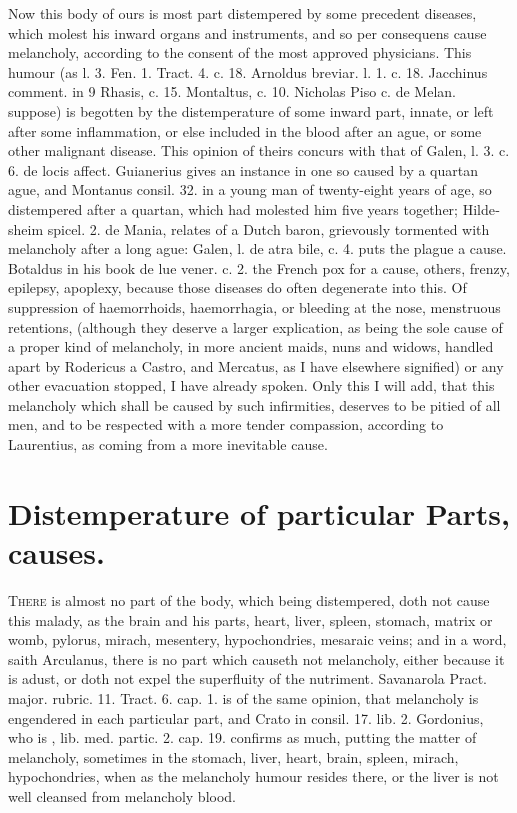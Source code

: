 {{Now this body of ours is most part distempered by some precedent
diseases, which molest his inward organs and instruments, and so per
consequens cause melancholy, according to the consent of the most
approved physicians. This humour (as \Avicenna{} l. 3. \textlatin{Fen. 1.
Tract. 4. c. 18. Arnoldus breviar. l. 1. c. 18. Jacchinus comment. in 9
Rhasis, c. 15. Montaltus, c. 10. Nicholas Piso c. de Melan. \etc{}
}suppose) is begotten by the distemperature of some inward part, innate,
or left after some inflammation, or else included in the blood after an
ague, or some other malignant disease. This opinion of theirs
concurs with that of Galen, \textlatin{l. 3. c. 6. de locis affect}. Guianerius
gives an instance in one so caused by a quartan ague, and Montanus
consil. 32. in a young man of twenty-eight years of age, so distempered
after a quartan, which had molested him five years together; \textlatin{Hildesheim
spicel. 2. de Mania}, relates of a Dutch baron, grievously tormented
with melancholy after a long ague: \textlatin{Galen, l. de atra bile, c. 4.}
puts the plague a cause. Botaldus in his book \textlatin{de lue vener}. c. 2. the
French pox for a cause, others, frenzy, epilepsy, apoplexy, because
those diseases do often degenerate into this. Of suppression of
haemorrhoids, haemorrhagia, or bleeding at the nose, menstruous
retentions, (although they deserve a larger explication, as being the
sole cause of a proper kind of melancholy, in more ancient maids, nuns
and widows, handled apart by Rodericus a Castro, and Mercatus, as I
have elsewhere signified) or any other evacuation stopped, I have
already spoken. Only this I will add, that this melancholy which shall
be caused by such infirmities, deserves to be pitied of all men, and to
be respected with a more tender compassion, according to Laurentius, as
coming from a more inevitable cause.

\section{Distemperature of particular Parts, causes.}

\lettrine{T}{here} is almost no part of the body, which being distempered, doth not
cause this malady, as the brain and his parts, heart, liver, spleen,
stomach, matrix or womb, pylorus, mirach, mesentery, hypochondries,
mesaraic veins; and in a word, saith Arculanus, there is no part
which causeth not melancholy, either because it is adust, or doth not
expel the superfluity of the nutriment. Savanarola Pract. major.
rubric. 11. Tract. 6. cap. 1. is of the same opinion, that melancholy
is engendered in each particular part, and Crato in \textlatin{consil. 17.
lib. 2.} Gordonius, who is , \textlatin{lib. med. partic. 2. cap. 19.}
confirms as much, putting the matter of melancholy, sometimes in
the stomach, liver, heart, brain, spleen, mirach, hypochondries, when
as the melancholy humour resides there, or the liver is not well
cleansed from melancholy blood.

}}
